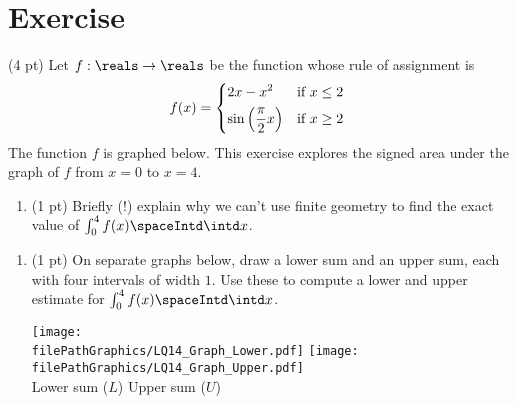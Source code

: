 %
%
%
%

\section{Exercise}


(4 pt) Let $f : \reals \rightarrow \reals$ be the function whose rule of assignment is
\begin{align*}
f(x)
=
\begin{dcases*}
2 x - x^{2}					&	if $x \leq 2$		\\
\sin\left(\frac{\pi}{2} x\right)	&	if $x \geq 2$
\end{dcases*}
\end{align*}
The function $f$ is graphed below. This exercise explores the signed area under the graph of $f$ from $x = 0$ to $x = 4$.



\begin{enumerate}[label=(\alph*)]
\item\label{itm : LQ14a} (1 pt) Briefly (!) explain why we can't use finite geometry to find the exact value of $\int_{0}^{4} f(x) \spaceIntd \intd x$.
\end{enumerate}




\begin{enumerate}[resume,label=(\alph*)]
\item\label{itm : LQ14b} (1 pt) On separate graphs below, draw a lower sum and an upper sum, each with four intervals of width $1$. Use these to compute a lower and upper estimate for $\int_{0}^{4} f(x) \spaceIntd \intd x$.
\begin{center}
\texttt{[image: \\filePathGraphics/LQ14\_Graph\_Lower.pdf]}%
\hspace{1in}
\texttt{[image: \\filePathGraphics/LQ14\_Graph\_Upper.pdf]}%
\\
Lower sum ($L$)
\hspace{2in}
Upper sum ($U$)
\end{center}
\end{enumerate}


